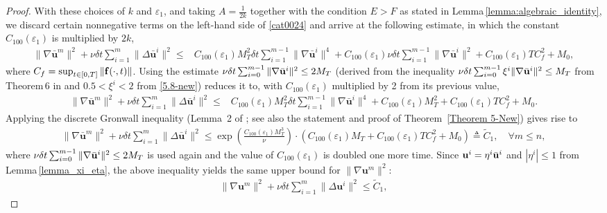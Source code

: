 \documentclass{article}
\theoremstyle{definition}                   %
\begin{document}
\begin{proof}
With these choices of $k$ and $\varepsilon_1$, and taking
$A = \frac{1}{2k}$ together with the condition $E > F$ as stated in
Lemma\,\ref{lemma:algebraic_identity}, we discard certain nonnegative
terms on the left-hand side of \eqref{cat0024} and arrive at the
following estimate, in which the constant $C_{100}(\varepsilon_1)$ is
multiplied by $2k$,
\begin{align}
\|\nabla\bar{\mathbf{u}}^m\|^2 + \nu\delta t \sum_{i=1}^m \|\Delta\bar{\mathbf{u}}^i\|^2 \leq & C_{100}(\varepsilon_1) M_T^2\delta t \sum_{i=1}^{m-1} \|\nabla\bar{\mathbf{u}}^i\|^4 
+ C_{100}(\varepsilon_1) \nu\delta t \sum_{i=1}^{m-1} \|\nabla\bar{\mathbf{u}}^i\|^2 + C_{100}(\varepsilon_1) T C_f^2 + M_0,
\label{5.23-new}
\end{align}
where $C_f=\sup_{t\in [0,T]} \|{\bf f}(\cdot, t)\|$.
Using the estimate
$\nu \delta t \sum_{i=0}^{m-1} \|\nabla \bar{\bf u}^i \|^2 \le 2 M_T$ (derived from the inequality $\nu \delta t \sum_{i=0}^{m-1} \xi^i \|\nabla \bar{\bf u}^i \|^2 \le M_T$ from Theorem\,6 in \cite{HuangShen2023} and $0.5<\xi^i<2$ from \eqref{5.8-new}) reduces it to, with $C_{100}(\varepsilon_1)$ multiplied by 2 from its previous value,
\begin{align}
\|\nabla\bar{\mathbf{u}}^m\|^2 + \nu\delta t \sum_{i=1}^m \|\Delta\bar{\mathbf{u}}^i\|^2 \leq & C_{100}(\varepsilon_1) M_T^2\delta t \sum_{i=1}^{m-1} \|\nabla\bar{\mathbf{u}}^i\|^4 
+ C_{100}(\varepsilon_1) M_T^2 + C_{100}(\varepsilon_1) T C_f^2 + M_0.
\label{cat0025}
\end{align}
%
Applying the discrete Gronwall inequality (Lemma~2 of \cite{HuangShen2023}; see also the statement and proof of Theorem~\ref{Theorem 5-New}) gives rise to
\begin{align}
\|\nabla\bar{\mathbf{u}}^m\|^2 + \nu\delta t \sum_{i=1}^m \|\Delta\bar{\mathbf{u}}^i\|^2 \leq 
\exp\left( \frac{C_{100}(\varepsilon_1)M_T^3}{\nu} \right) 
\cdot ( C_{100}(\varepsilon_1)M_T + C_{100}(\varepsilon_1) TC_f^2 + M_0)
\triangleq \tilde{C}_1,
\quad \forall m\le n, 
\label{5.24-new}
\end{align}
where $\nu \delta t \sum_{i=0}^{m-1} \|\nabla \bar{\bf u}^i \|^2 \le 2 M_T$ is used again and the value of $C_{100}(\varepsilon_1)$ is doubled one more time.
Since ${\bf u}^i=\eta^i \bar{\bf u}^i$ and $|\eta^i| \le 1$ from Lemma\,\ref{lemma_xi_eta}, the above inequality yields the same upper bound for $\|\nabla\mathbf{u}^m\|^2$:
\begin{align}
\|\nabla\mathbf{u}^m\|^2 + \nu\delta t \sum_{i=1}^m \|\Delta\mathbf{u}^i\|^2 \le \tilde{C}_1,

\end{align}
\end{proof}
\end{document}
